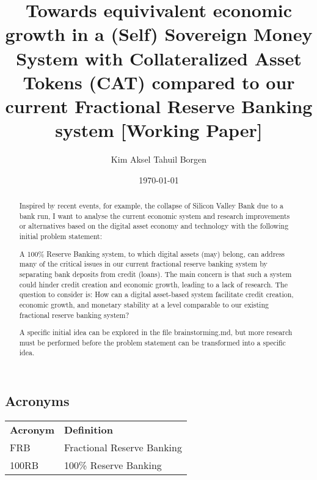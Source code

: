 \documentclass{article}
\title{Towards equivivalent economic growth in a (Self) Sovereign Money System with Collateralized Asset Tokens (CAT) compared to our current Fractional Reserve Banking system [Working Paper]}
\author{Kim Aksel Tahuil Borgen}
\date{\today}
\begin{document}
\maketitle
\begin{abstract}
    Inspired by recent events, for example, the collapse of Silicon Valley Bank due to a bank run, I want to analyse the current economic system and research improvements or alternatives based on the digital asset economy and technology with the following initial problem statement:

    A 100\% Reserve Banking system, to which digital assets (may) belong, can address many of the critical issues in our current fractional reserve banking system by separating bank deposits from credit (loans). The main concern is that such a system could hinder credit creation and economic growth, leading to a lack of research. The question to consider is: How can a digital asset-based system facilitate credit creation, economic growth, and monetary stability at a level comparable to our existing fractional reserve banking system? 
    
    A specific initial idea can be explored in the file brainstorming.md, but more research must be performed before the problem statement can be transformed into a specific idea. 
\end{abstract}

\subsection{Acronyms}

\begin{tabular}{ll}
\textbf{Acronym} & \textbf{Definition} \\
FRB & Fractional Reserve Banking \\
100RB & 100\% Reserve Banking \\
\end{tabular}





\printbibliography
\end{document}
